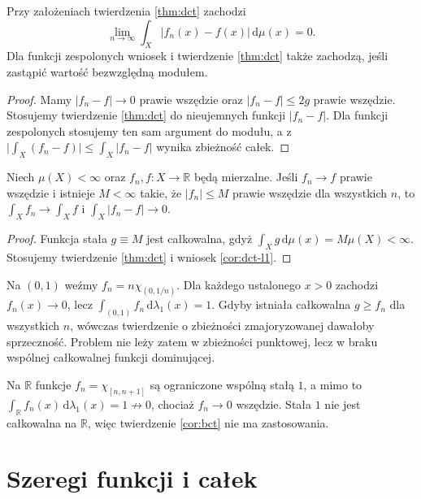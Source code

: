 \begin{wniosek}
\label{cor:dct-l1}
Przy założeniach twierdzenia \ref{thm:dct} zachodzi
\[
\lim_{n\to\infty}\int_X|f_n(x)-f(x)|\,\mathrm d\mu(x)=0.
\]
Dla funkcji zespolonych wniosek i twierdzenie
\ref{thm:dct} także zachodzą, jeśli zastąpić
wartość bezwzględną modułem.
\end{wniosek}
\begin{proof}
Mamy $|f_n-f|\to0$ prawie wszędzie oraz
$|f_n-f|\le2g$ prawie wszędzie.
Stosujemy twierdzenie \ref{thm:dct} do nieujemnych
funkcji $|f_n-f|$. Dla funkcji zespolonych
stosujemy ten sam argument do modułu, a z
$\bigl|\int_X(f_n-f)\bigr|\le\int_X|f_n-f|$
wynika zbieżność całek.
\end{proof}

\begin{wniosek}
\label{cor:bct}
Niech $\mu(X)<\infty$ oraz $f_n,f:X\to\mathbb R$
będą mierzalne. Jeśli $f_n\to f$ prawie wszędzie
i istnieje $M<\infty$ takie, że $|f_n|\le M$
prawie wszędzie dla wszystkich $n$, to
$\int_X f_n\to\int_X f$ i $\int_X|f_n-f|\to0$.
\end{wniosek}
\begin{proof}
Funkcja stała $g\equiv M$ jest całkowalna,
gdyż $\int_X g\,\mathrm d\mu(x)=M\mu(X)<\infty$.
Stosujemy twierdzenie \ref{thm:dct} i wniosek
\ref{cor:dct-l1}.
\end{proof}

\begin{przyklad}
Na $(0,1)$ weźmy
$f_n=n\chi_{(0,1/n)}$.
Dla każdego ustalonego $x>0$ zachodzi $f_n(x)\to0$,
lecz $\int_{(0,1)}f_n\,\mathrm d\lambda_1(x)=1$.
Gdyby istniała całkowalna $g\ge f_n$ dla wszystkich
$n$, wówczas twierdzenie o zbieżności zmajoryzowanej
dawałoby sprzeczność. Problem nie leży zatem
w zbieżności punktowej, lecz w braku wspólnej
całkowalnej funkcji dominującej.
\end{przyklad}

\begin{przyklad}
Na $\mathbb R$ funkcje $f_n=\chi_{[n,n+1]}$
są ograniczone wspólną stałą $1$, a mimo to
$\int_{\mathbb R}f_n(x)\,\mathrm d\lambda_1(x)=1\not\to0$, chociaż $f_n\to0$ wszędzie.
Stała $1$ nie jest całkowalna na $\mathbb R$,
więc twierdzenie \ref{cor:bct} nie ma zastosowania.
\end{przyklad}

\section{Szeregi funkcji i całek}

